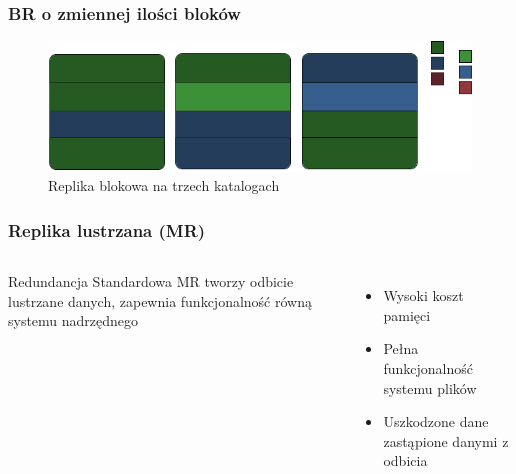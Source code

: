 \documentclass{beamer}
\begin{document}
\begin{frame}
    \frametitle{BR o zmiennej ilości bloków}
    \begin{figure}[h!]
            \centering
            \includegraphics[scale=0.6]{BR-2.png}
            \caption{Replika blokowa na trzech katalogach}
            \label{fig:br2}
    \end{figure}
\end{frame}


\begin{frame}
        \frametitle{Replika lustrzana (MR)}
	\begin{columns}
		\begin{block}{Redundancja}
                Standardowa MR tworzy odbicie lustrzane danych, zapewnia funkcjonalność równą systemu nadrzędnego
		\end{block}
		\begin{itemize}
			\item Wysoki koszt pamięci
			\item Pełna funkcjonalność systemu plików
			\item Uszkodzone dane zastąpione danymi z odbicia
		\end{itemize}
	\end{columns}
\end{frame}
	
\end{document}
